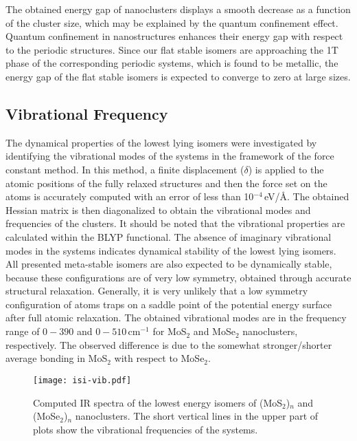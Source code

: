 \documentclass[nofootinbib,10pt,aip,twocolumn,showpacs]{revtex4-1}
\begin{document}
The obtained energy gap of nanoclusters displays a smooth decrease
as a function of the cluster size, which may be explained 
by the quantum confinement effect.
Quantum confinement in nanostructures enhances their energy gap 
with respect to the periodic structures.
Since our flat stable isomers are approaching the 1T phase of 
the corresponding periodic systems, which is found to be metallic,
the energy gap of the flat stable isomers is expected to converge 
to zero at large sizes.

\subsection{Vibrational Frequency}  

The dynamical properties of the lowest lying isomers were investigated 
by identifying the vibrational modes of the systems in 
the framework of the force constant method. 
In this method, a finite displacement ($\delta$) is applied to the atomic positions 
of the fully relaxed structures and then the force set on the atoms
is accurately computed with an error of less than 10$^{-4}$\,eV/\AA. 
The obtained Hessian matrix is then diagonalized to obtain 
the vibrational modes and frequencies of the clusters.
It should be noted that the vibrational properties are 
calculated within the BLYP functional.
The absence of imaginary vibrational modes in the systems  
indicates dynamical stability of the lowest lying isomers. 
All presented meta-stable isomers are also expected to be dynamically stable,
because these configurations are of very low symmetry, obtained through
accurate structural relaxation.
Generally, it is very unlikely that a low symmetry configuration of atoms
traps on a saddle point of the potential energy surface after full atomic relaxation.
The obtained vibrational modes are in the frequency range of $0-390$ and $0-510$\,cm$^{-1}$
for MoS$_2$ and MoSe$_2$ nanoclusters, respectively.
The observed difference is due to the somewhat stronger/shorter 
average bonding in MoS$_2$ with respect to MoSe$_2$.


\begin{figure}
\texttt{[image: isi-vib.pdf]}
\caption{\label{ir}
 Computed IR spectra of the lowest energy isomers of 
 (MoS$_2$)$_n$ and (MoSe$_2$)$_n$ nanoclusters.
 The short vertical lines in the upper part of plots
 show the vibrational frequencies of the systems.
}
\end{figure}
\end{document}
